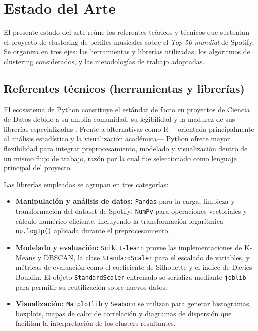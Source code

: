 \section{Estado del Arte}

El presente estado del arte reúne los referentes teóricos y técnicos que sustentan el proyecto de clustering de perfiles musicales sobre el \textit{Top 50 mundial} de Spotify. Se organiza en tres ejes: las herramientas y librerías utilizadas, los algoritmos de clustering considerados, y las metodologías de trabajo adoptadas.

\subsection{Referentes técnicos (herramientas y librerías)}

El ecosistema de Python constituye el estándar de facto en proyectos de Ciencia de Datos debido a su amplia comunidad, su legibilidad y la madurez de sus librerías especializadas \cite{vanderplas2016python}. Frente a alternativas como R ---orientada principalmente al análisis estadístico y la visualización académica--- Python ofrece mayor flexibilidad para integrar preprocesamiento, modelado y visualización dentro de un mismo flujo de trabajo, razón por la cual fue seleccionado como lenguaje principal del proyecto.

Las librerías empleadas se agrupan en tres categorías:

\begin{itemize}
    \item \textbf{Manipulación y análisis de datos:} \texttt{Pandas} \cite{mckinney2010data} para la carga, limpieza y transformación del dataset de Spotify; \texttt{NumPy} \cite{harris2020array} para operaciones vectoriales y cálculo numérico eficiente, incluyendo la transformación logarítmica \texttt{np.log1p()} aplicada durante el preprocesamiento.
    \item \textbf{Modelado y evaluación:} \texttt{Scikit-learn} \cite{pedregosa2011scikit} provee las implementaciones de K-Means y DBSCAN, la clase \texttt{StandardScaler} para el escalado de variables, y métricas de evaluación como el coeficiente de Silhouette y el índice de Davies-Bouldin. El objeto \texttt{StandardScaler} entrenado se serializa mediante \texttt{joblib} para permitir su reutilización sobre nuevos datos.
    \item \textbf{Visualización:} \texttt{Matplotlib} \cite{hunter2007matplotlib} y \texttt{Seaborn} \cite{waskom2021seaborn} se utilizan para generar histogramas, boxplots, mapas de calor de correlación y diagramas de dispersión que facilitan la interpretación de los clusters resultantes.
\end{itemize}

